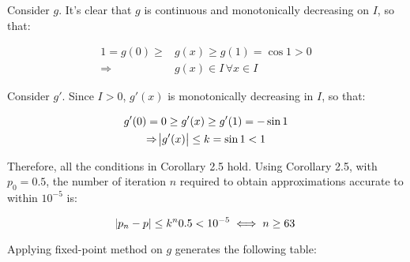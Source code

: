 \documentclass[../../../../Assignments]{subfiles}
\begin{document}
\begin{solution}
\begin{enumerate}[label = \alph*)]
            Consider \(g\). It's clear that \(g\) is continuous and
            monotonically decreasing on \(I\), so that:

            \begin{align*}
                1 = g(0) \geq &g(x) \geq g(1) = \cos{1} > 0  \\
                  \Rightarrow &g(x) \in I \, \forall x \in I
            \end{align*}

            Consider \(g'\). Since \(I > 0\), \(g'(x)\) is monotonically
            decreasing in \(I\), so that:

            \begin{gather*}
                g'(0) = 0 \geq g'(x) \geq g'(1) = - \sin{1} \\
                \Rightarrow \abs{g'(x)} \leq k = \sin{1} < 1
            \end{gather*}

            Therefore, all the conditions in Corollary 2.5 hold. Using Corollary
            2.5, with \(p_0 = \num{0.5}\), the number of iteration \(n\)
            required to obtain approximations accurate to within \(10^{-5}\) is:

            \[\abs{p_n - p} \leq k^n \num{0.5} < 10^{-5} \iff n \geq 63\]

            Applying fixed-point method on \(g\) generates the following table:


\end{enumerate}
\end{solution}
\end{document}
